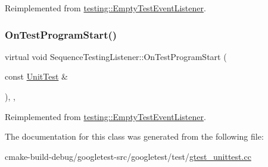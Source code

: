 Reimplemented from \mbox{\hyperlink{classtesting_1_1EmptyTestEventListener_a0abcc02bd2331a2e29ad6f4d9daf2a32}{testing\+::\+Empty\+Test\+Event\+Listener}}.

\mbox{\label{classSequenceTestingListener_a25b96acdbaa6f582e583e6b56bd39b42}} 
\subsubsection{\texorpdfstring{OnTestProgramStart()}{OnTestProgramStart()}}
{\footnotesize\ttfamily virtual void Sequence\+Testing\+Listener\+::\+On\+Test\+Program\+Start (\begin{DoxyParamCaption}\item[{const \mbox{\hyperlink{classtesting_1_1UnitTest}{Unit\+Test}} \&}]{ }\end{DoxyParamCaption})\hspace{0.3cm}{\ttfamily [inline]}, {\ttfamily [protected]}, {\ttfamily [virtual]}}



Reimplemented from \mbox{\hyperlink{classtesting_1_1EmptyTestEventListener_aa3847c8a3c22d8d69a6006dfdd6589fc}{testing\+::\+Empty\+Test\+Event\+Listener}}.



The documentation for this class was generated from the following file\+:\begin{DoxyCompactItemize}
\item 
cmake-\/build-\/debug/googletest-\/src/googletest/test/\mbox{\hyperlink{gtest__unittest_8cc}{gtest\+\_\+unittest.\+cc}}\end{DoxyCompactItemize}
